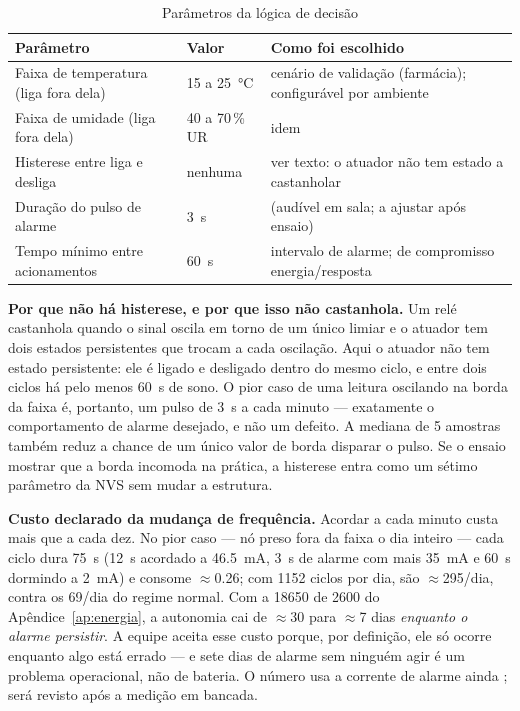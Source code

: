 \begin{table}[H]
\centering
\caption{Parâmetros da lógica de decisão}
\label{tab:limiares}
\footnotesize
\begin{tabular}{@{}L{4.0cm}C{2.6cm}L{6.8cm}@{}}
\toprule
\textbf{Parâmetro} & \textbf{Valor} & \textbf{Como foi escolhido} \\
\midrule
Faixa de temperatura (liga fora dela) & 15 a \SI{25}{\celsius} & cenário de validação (farmácia); configurável por ambiente \\
Faixa de umidade (liga fora dela) & 40 a 70\,\% UR & idem \\
Histerese entre liga e desliga & nenhuma & ver texto: o atuador não tem estado a castanholar \\
Duração do pulso de alarme & \SI{3}{\second} & \estimativa{} (audível em sala; a ajustar após ensaio) \\
Tempo mínimo entre acionamentos & \SI{60}{\second} & intervalo de alarme; \estimativa{} de compromisso energia/resposta \\
\bottomrule
\end{tabular}
\end{table}

\textbf{Por que não há histerese, e por que isso não castanhola.} Um
relé castanhola quando o sinal oscila em torno de um único limiar e o
atuador tem dois estados persistentes que trocam a cada oscilação.
Aqui o atuador não tem estado persistente: ele é ligado e desligado
dentro do mesmo ciclo, e entre dois ciclos há pelo menos
\SI{60}{\second} de sono. O pior caso de uma leitura oscilando na borda
da faixa é, portanto, um pulso de \SI{3}{\second} a cada minuto ---
exatamente o comportamento de alarme desejado, e não um defeito. A
mediana de 5 amostras também reduz a chance de um único valor de borda
disparar o pulso. Se o ensaio  mostrar que a borda incomoda na
prática, a histerese entra como um sétimo parâmetro da NVS sem mudar a
estrutura.

\textbf{Custo declarado da mudança de frequência.} Acordar a cada
minuto custa mais que a cada dez. No pior caso --- nó preso fora da
faixa o dia inteiro --- cada ciclo dura \SI{75}{\second}
(\SI{12}{\second} acordado a \SI{46,5}{\milli\ampere}, \SI{3}{\second} de
alarme com mais \SI{35}{\milli\ampere} e \SI{60}{\second} dormindo a
\SI{2}{\milli\ampere}) e consome $\approx$\SI{0,26}{\mAh}; com
\num{1152} ciclos por dia, são $\approx$\SI{295}{\mAh}/dia, contra os \SI{69}{\mAh}/dia
do regime normal. Com a 18650 de \SI{2600}{\mAh} do
Apêndice~\ref{ap:energia}, a autonomia cai de $\approx$30 para
$\approx$7 dias \emph{enquanto o alarme persistir}. A equipe aceita
esse custo porque, por definição, ele só ocorre enquanto algo está
errado --- e sete dias de alarme sem ninguém agir é um problema
operacional, não de bateria. O número usa a corrente de alarme ainda
\estimativa{}; será revisto após a medição em bancada.

